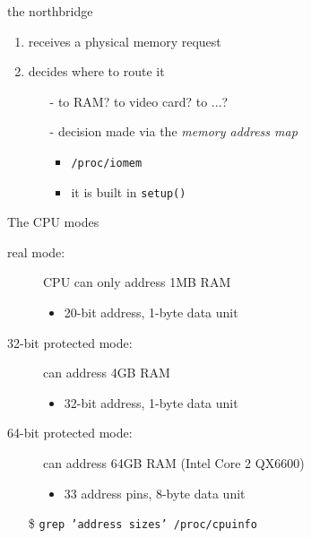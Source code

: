 \begin{frame}%
  \begin{block}{the northbridge}
    \begin{enumerate}
    \item receives a physical memory request
    \item decides where to route it
      \begin{itemize}
      \item[-] to RAM? to video card? to ...?
      \item[-] decision made via the \emph{memory address map}
        \begin{itemize}
        \item \texttt{/proc/iomem}
        \item it is built in \texttt{setup()}
        \end{itemize}
      \end{itemize}
    \end{enumerate}
  \end{block}
\end{frame}


\begin{frame}%
  \begin{block}{The CPU modes}
    \begin{description}
    \item[real mode:] CPU can only address 1MB RAM
      \begin{itemize}
      \item 20-bit address, 1-byte data unit
      \end{itemize}
    \item[32-bit protected mode:] can address 4GB RAM
      \begin{itemize}
      \item 32-bit address, 1-byte data unit
      \end{itemize}
    \item[64-bit protected mode:] can address 64GB RAM (Intel Core 2 QX6600)
      \begin{itemize}
      \item 33 address pins, 8-byte data unit
      \end{itemize}
    \end{description}
  \end{block}
  \begin{itemize}
  \item[\$] \texttt{grep 'address sizes' /proc/cpuinfo}
  \end{itemize}
\end{frame}

